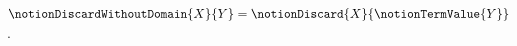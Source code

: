 

\begin{definition}\label{notion_discard_without_argument_domain}
    $\notionDiscardWithoutDomain{X}{Y}=\notionDiscard{X}{\notionTermValue{Y}}$.
\end{definition}
